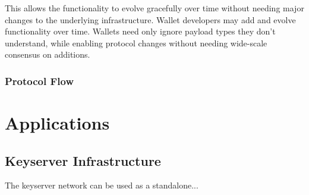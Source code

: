 \documentclass{article}
\begin{document}
This allows the functionality to evolve gracefully over time without needing major changes to the underlying infrastructure. Wallet developers may add and evolve functionality over time. Wallets need only ignore payload types they don't understand, while enabling protocol changes without needing wide-scale consensus on additions.

\subsubsection{Protocol Flow}



\section{Applications}

\subsection{Keyserver Infrastructure}

The keyserver network can be used as a standalone...
\end{document}

